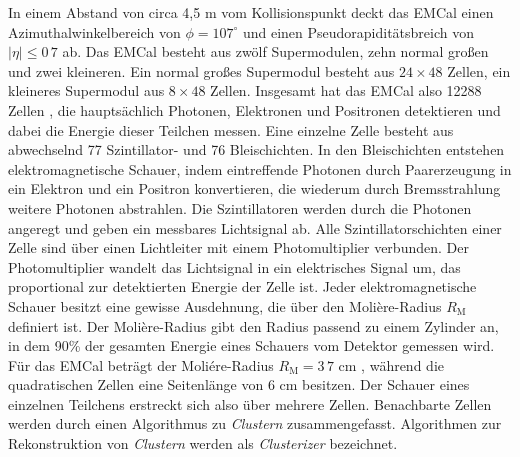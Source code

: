 In einem Abstand von circa 4,5 m vom Kollisionspunkt deckt das EMCal einen Azimuthalwinkelbereich von $\phi=107^{\circ}$ und einen Pseudorapiditätsbreich von $ |\eta| \leq 0\,7$ ab.
Das EMCal besteht aus zwölf Supermodulen, zehn normal großen und zwei kleineren.
Ein normal großes Supermodul besteht aus $24\times48$ Zellen, ein kleineres Supermodul aus $8\times48$ Zellen.
Insgesamt hat das EMCal also 12288 Zellen \cite{Cortese:2008zza}, die hauptsächlich Photonen, Elektronen und Positronen detektieren und dabei die Energie dieser Teilchen messen.
Eine einzelne Zelle besteht aus abwechselnd 77 Szintillator- und 76 Bleischichten.
In den Bleischichten entstehen elektromagnetische Schauer, indem eintreffende Photonen durch Paarerzeugung in ein Elektron und ein Positron konvertieren, die wiederum durch Bremsstrahlung weitere Photonen abstrahlen.
Die Szintillatoren werden durch die Photonen angeregt und geben ein messbares Lichtsignal ab.
Alle Szintillatorschichten einer Zelle sind über einen Lichtleiter mit einem Photomultiplier verbunden.
Der Photomultiplier wandelt das Lichtsignal in ein elektrisches Signal um, das proportional zur detektierten Energie der Zelle ist.
\newline
Jeder elektromagnetische Schauer besitzt eine gewisse Ausdehnung, die über den Moli\`ere-Radius $R_{\text{M}}$ definiert ist.
Der Moli\`ere-Radius gibt den Radius passend zu einem Zylinder an, in dem 90\% der gesamten Energie eines Schauers vom Detektor gemessen wird.
Für das EMCal beträgt der Moliére-Radius $R_{\text{M}} = 3\,7$ cm \cite{Cortese:2008zza}, während die quadratischen Zellen eine Seitenlänge von 6 cm besitzen. 
Der Schauer eines einzelnen Teilchens erstreckt sich also über mehrere Zellen.
\newline
Benachbarte Zellen werden durch einen Algorithmus zu \textit{Clustern} zusammengefasst.
Algorithmen zur Rekonstruktion von \textit{Clustern} werden als \textit{Clusterizer} bezeichnet.
